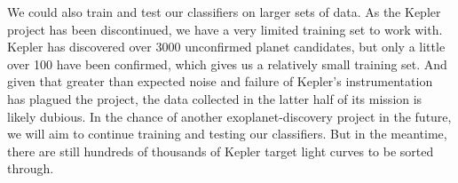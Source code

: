 \documentclass{amsart}
\begin{document}
We could also train and test our classifiers on larger sets of data. As the Kepler project has been discontinued, we have a very limited training set to work with. Kepler has discovered over 3000 unconfirmed planet candidates, but only a little over 100 have been confirmed, which gives us a relatively small training set. And given that greater than expected noise and failure of Kepler's instrumentation has plagued the project, the data collected in the latter half of its mission is likely dubious.  In the chance of another exoplanet-discovery project in the future, we will aim to continue training and testing our classifiers. But in the meantime, there are still hundreds of thousands of Kepler target light curves to be sorted through.
\end{document}
